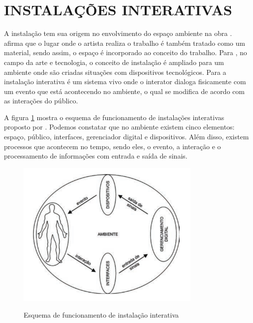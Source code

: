 \section{INSTALAÇÕES INTERATIVAS}

A instalação tem sua origem no envolvimento do espaço ambiente na obra .  afirma que o lugar onde o artista realiza o trabalho é também tratado como um material, sendo assim, o espaço é incorporado ao conceito do trabalho. Para , no campo da arte e tecnologia, o conceito de instalação é ampliado para um ambiente onde são criadas situações com dispositivos tecnológicos. Para  a instalação interativa é um sistema vivo onde o interator dialoga fisicamente com um evento que está acontecendo no ambiente, o qual se modifica de acordo com as interações do público.


A figura \ref{fig:instalacoes_interativas} mostra o esquema de funcionamento de instalações interativas proposto por . Podemos constatar que no ambiente existem cinco elementos: espaço, público, interfaces, gerenciador digital e dispositivos. Além disso, existem processos que acontecem no tempo, sendo eles, o evento, a interação e o processamento de informações com entrada e saída de sinais. 

\begin{figure}[H]
    \centering
    \caption{Esquema de funcionamento de instalação interativa}
	\vspace*{0,2cm}
    \includegraphics[width=0.8\textwidth]{./04-figuras/instalacoes_interativas}
    \label{fig:instalacoes_interativas}
\end{figure}
\vspace*{-0,9cm}
{\raggedright {}}\\


